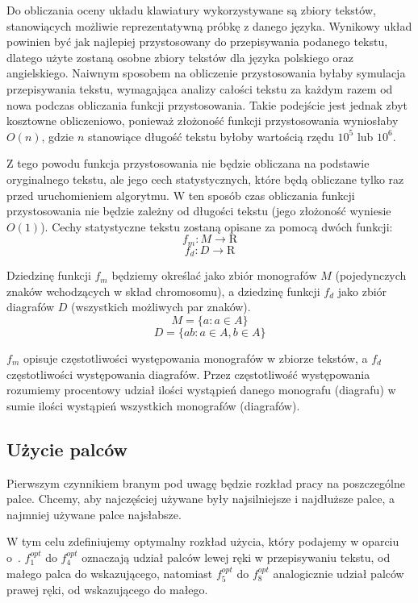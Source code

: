 \documentclass[brudnopis]{xmgr}
\begin{document}
Do obliczania oceny układu klawiatury wykorzystywane są zbiory tekstów, stanowiących możliwie reprezentatywną próbkę z danego języka. Wynikowy układ powinien być jak najlepiej przystosowany do przepisywania podanego tekstu, dlatego użyte zostaną osobne zbiory tekstów dla języka polskiego oraz angielskiego. Naiwnym sposobem na obliczenie przystosowania byłaby symulacja przepisywania tekstu, wymagająca analizy całości tekstu za każdym razem od nowa podczas obliczania funkcji przystosowania. Takie podejście jest jednak zbyt kosztowne obliczeniowo, ponieważ złożoność funkcji przystosowania wyniosłaby $ O(n) $, gdzie $ n $ stanowiące długość tekstu byłoby wartością rzędu $ 10^5 $ lub $ 10^6 $.

Z tego powodu funkcja przystosowania nie będzie obliczana na podstawie oryginalnego tekstu, ale jego cech statystycznych, które będą obliczane tylko raz przed uruchomieniem algorytmu. W ten sposób czas obliczania funkcji przystosowania nie będzie zależny od długości tekstu (jego złożoność wyniesie $ O(1) $). Cechy statystyczne tekstu zostaną opisane za pomocą dwóch funkcji:
$$ f_m : M \rightarrow \mathrm{R} $$
$$ f_d : D \rightarrow \mathrm{R} $$

Dziedzinę funkcji $ f_m $ będziemy określać jako zbiór monografów $ M $ (pojedynczych znaków wchodzących w skład chromosomu), a dziedzinę funkcji $ f_d $ jako zbiór diagrafów $ D $ (wszystkich możliwych par znaków).
$$ M = \{ a : a \in A \} $$
$$ D = \{ ab : a \in A, b \in A \} $$

$ f_m $ opisuje częstotliwości występowania monografów w zbiorze tekstów, a $ f_d $ częstotliwości występowania diagrafów. Przez częstotliwość występowania rozumiemy procentowy udział ilości wystąpień danego monografu (diagrafu) w sumie ilości wystąpień wszystkich monografów (diagrafów).


\subsection{Użycie palców}

Pierwszym czynnikiem branym pod uwagę będzie rozkład pracy na poszczególne palce. Chcemy, aby najczęściej używane były najsilniejsze i najdłuższe palce, a najmniej używane palce najsłabsze.

W tym celu zdefiniujemy optymalny rozkład użycia, który podajemy w oparciu o~\cite{Eggers2003672}. $f^{opt}_1$ do $f^{opt}_4$ oznaczają udział palców lewej ręki w przepisywaniu tekstu, od małego palca do wskazującego, natomiast $f^{opt}_5$ do $f^{opt}_8$ analogicznie udział palców prawej ręki, od wskazującego do małego.\newline
\end{document}
